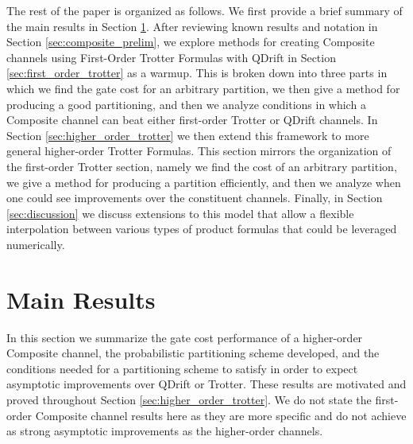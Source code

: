 The rest of the paper is organized as follows. We first provide a brief summary of the main results in Section \ref{sec:main}. After reviewing known results and notation in Section \ref{sec:composite_prelim}, we explore methods for creating Composite channels using First-Order Trotter Formulas with QDrift in Section \ref{sec:first_order_trotter} as a warmup. This is broken down
into three parts in which we find the gate cost for an arbitrary partition, we then give a method for producing a good partitioning, and then we analyze conditions in which a Composite channel can beat either first-order Trotter or QDrift channels. In Section \ref{sec:higher_order_trotter} we then extend this framework to more general higher-order Trotter Formulas. This section mirrors the organization of the first-order Trotter section,
namely we find the cost of an arbitrary partition, we give a method for producing a partition efficiently, and then we analyze when one could see
improvements over the constituent channels. Finally, in Section \ref{sec:discussion} we discuss extensions to this model that allow a flexible interpolation between various types of product formulas that could be leveraged numerically. 

\section{Main Results} \label{sec:main}
In this section we summarize the gate cost performance of a higher-order Composite channel, the probabilistic partitioning scheme developed, and the conditions needed for a partitioning scheme to satisfy in order to expect asymptotic improvements over QDrift or Trotter. These results are motivated and proved throughout Section \ref{sec:higher_order_trotter}. We do not state the first-order Composite channel results here as they are more specific and do not achieve as strong asymptotic improvements as the higher-order channels.

